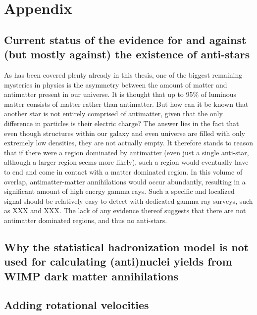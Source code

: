 \section{Appendix}
\subsection{Current status of the evidence for and against (but mostly against) the existence of anti-stars}
As has been covered plenty already in this thesis, one of the biggest remaining mysteries in physics is the asymmetry between the amount of matter and antimatter present in our universe. It is thought that up to 95\% of luminous matter consists of matter rather than antimatter\cite{}. But how can it be known that another star is not entirely comprised of antimatter, given that the only difference in particles is their electric charge? The answer lies in the fact that even though structures within our galaxy and even universe are filled with only extremely low densities, they are not actually empty. It therefore stands to reason that if there were a region dominated by antimatter (even just a single anti-star, although a larger region seems more likely), such a region would eventually have to end and come in contact with a matter dominated region. In this volume of overlap, antimatter-matter annihilations would occur abundantly, resulting in a significant amount of high energy gamma rays. Such a specific and localized signal should be relatively easy to detect with dedicated gamma ray surveys, such as XXX\cite{} and XXX\cite{}. The lack of any evidence thereof suggests that there are not antimatter dominated regions, and thus no anti-stars. 
\subsection{Why the statistical hadronization model is not used for calculating (anti)nuclei yields from WIMP dark matter annihilations}\label{App:statHadronModel}
\subsection{Adding rotational velocities}